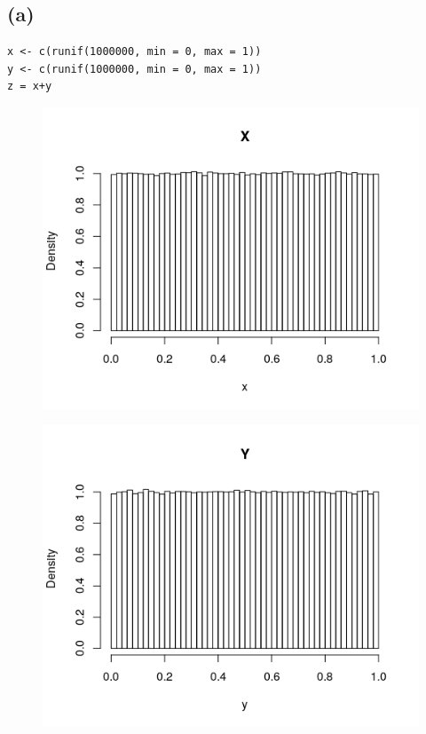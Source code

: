 \documentclass[a4paper]{scrartcl}
\begin{document}
\subsection*{(a)}
\begin{lstlisting}
x <- c(runif(1000000, min = 0, max = 1))
y <- c(runif(1000000, min = 0, max = 1))
z = x+y
\end{lstlisting}
\begin{figure}[H]
	\includegraphics[scale=0.7]{Rplot02.png}
\end{figure}
\begin{figure}[H]
	\includegraphics[scale=0.7]{Rplot03.png}
\end{figure}
\end{document}
